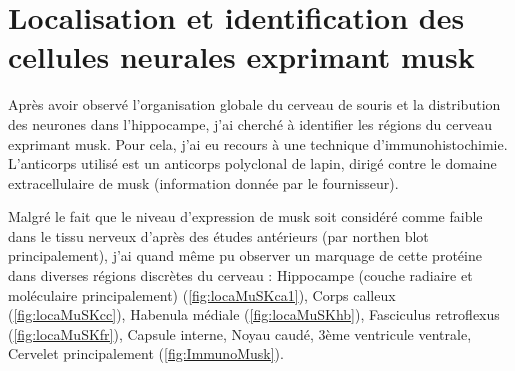 	\FloatBarrier
	
\section{Localisation et identification des cellules neurales exprimant \acrshort{musk}}
	\label{ssec:musk}
	Après avoir observé l'organisation globale du cerveau de souris et la distribution des neurones dans l'hippocampe, j'ai cherché à identifier les régions du cerveau exprimant \gls{musk}. Pour cela, j'ai eu recours à une technique d'immunohistochimie. L'anticorps utilisé est un anticorps polyclonal de lapin, dirigé contre le domaine extracellulaire de \gls{musk} (information donnée par le fournisseur).
	
	Malgré le fait que le niveau d'expression de \gls{musk} soit considéré comme faible dans le tissu nerveux d'après des études antérieurs (par northen blot principalement), j'ai quand même pu observer un marquage de cette protéine dans diverses régions discrètes du cerveau : Hippocampe (couche radiaire et moléculaire principalement) (\cref{fig:locaMuSKca1}), Corps calleux (\cref{fig:locaMuSKcc}), Habenula médiale (\cref{fig:locaMuSKhb}), Fasciculus retroflexus (\cref{fig:locaMuSKfr}), Capsule interne, Noyau caudé, 3ème ventricule ventrale, Cervelet principalement (\cref{fig:ImmunoMusk}). 
	
